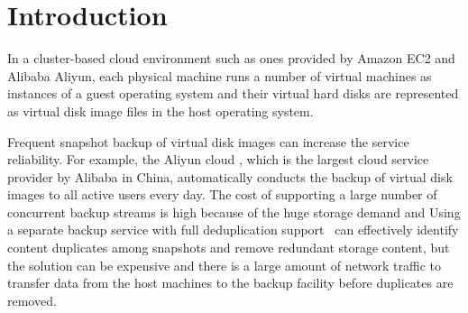 \section{Introduction}
In a cluster-based cloud environment such as ones provided by Amazon EC2\cite{AmazonEC2} 
and Alibaba Aliyun\cite{Aliyun},
each physical machine runs a number  of virtual machines as  instances of a guest operating system 
and their  virtual hard disks are represented as virtual disk image files in the host operating system.

Frequent  snapshot backup of virtual disk images  can increase  the service reliability. 
For example, the Aliyun cloud , which is  the largest cloud service provider by Alibaba in China, 
automatically conducts  the backup of virtual disk images to all active users every day.
The cost of supporting a large number of concurrent backup streams is high
because of the huge storage demand and  
Using a separate  backup service with full deduplication support~\cite{venti02,bottleneck08}
can effectively identify content duplicates among snapshots and  remove 
redundant storage content,  but the solution can be expensive and there is a large amount of 
network traffic to transfer  data from the host machines to the backup facility
before duplicates are removed.


